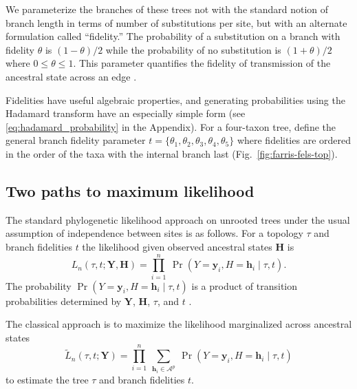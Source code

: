 \documentclass{article}
\newcommand{\alphabet}{\mathcal{A}}
\newcommand{\fullAlignment}{\mathbf{Y}}
\newcommand{\alignmentColumn}{\mathbf{y}}
\newcommand{\alignmentColumnRV}{Y}
\newcommand{\fullAncestralStates}{\mathbf{H}}
\newcommand{\ancestralStateColumn}{\mathbf{h}}
\newcommand{\ancestralStateColumnRV}{H}
\newcommand{\nCols}{n}
\newcommand{\nAncestralStateRows}{p}
\begin{document}
We parameterize the branches of these trees not with the standard notion of branch length in terms of number of substitutions per site, but with an alternate formulation called ``fidelity.''
The probability of a substitution on a branch with fidelity $\theta$ is $(1-\theta)/2$ while the probability of no substitution is $(1+\theta)/2$ where $0 \le \theta \le 1$.
This parameter quantifies the fidelity of transmission of the ancestral state across an edge \cite{Matsen2007-jq}.

Fidelities have useful algebraic properties, and generating probabilities using the Hadamard transform have an especially simple form (see \eqref{eq:hadamard_probability} in the Appendix).
For a four-taxon tree, define the general branch fidelity parameter $t=\{\theta_1,\theta_2,\theta_3,\theta_4,\theta_5\}$ where fidelities are ordered in the order of the taxa with the internal branch last (Fig.~\ref{fig:farris-fels-top}).

\subsection*{Two paths to maximum likelihood}

The standard phylogenetic likelihood approach on unrooted trees under the usual assumption of independence between sites is as follows.
For a topology $\tau$ and branch fidelities $t$ the likelihood given observed ancestral states $\fullAncestralStates$ is
\begin{equation}
\label{eq:full_likelihood}
L_\nCols(\tau, t; \fullAlignment,\fullAncestralStates) = \prod_{i=1}^{\nCols} \ \Pr(\alignmentColumnRV=\alignmentColumn_i, \ancestralStateColumnRV=\ancestralStateColumn_i \mid \tau, t).
\end{equation}
The probability $\Pr(\alignmentColumnRV=\alignmentColumn_i, \ancestralStateColumnRV=\ancestralStateColumn_i \mid \tau, t)$ is a product of transition probabilities determined by $\fullAlignment$, $\fullAncestralStates$, $\tau$, and $t$ \cite{Felsenstein2004}.

The classical approach is to maximize the likelihood marginalized across ancestral states
\begin{equation}
\label{eq:marginal_likelihood}
\tilde{L}_\nCols(\tau, t; \fullAlignment) = \prod_{i=1}^{\nCols} \ \sum_{\ancestralStateColumn_i\in\alphabet^{\nAncestralStateRows}} \ \Pr(\alignmentColumnRV=\alignmentColumn_i, \ancestralStateColumnRV=\ancestralStateColumn_i \mid \tau, t)
\end{equation}
to estimate the tree $\tau$ and branch fidelities $t$.
\end{document}
